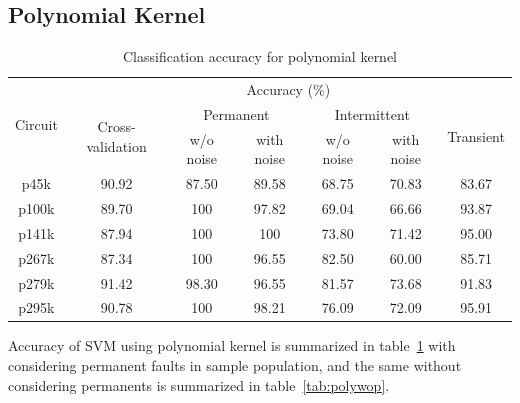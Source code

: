\subsection{Polynomial Kernel}
\begin{table}[h]

	\captionsetup{justification=centering}
\begin{tabular}{ccccccc}
\hline
\multirow{3}{*}{Circuit} & \multicolumn{6}{c}{Accuracy (\%)}\\ \cline{2-7} 
                         & \multirow{2}{*}{Cross-validation} & \multicolumn{2}{c}{Permanent} & \multicolumn{2}{c}{Intermittent} & \multirow{2}{*}{Transient} \\ \cline{3-6}
                         &                                   & w/o noise     & with noise    & w/o noise      & with noise      &                            \\ \hline
p45k                     & 90.92                             & 87.50         & 89.58         & 68.75          & 70.83           & 83.67                      \\
p100k                    & 89.70                             & 100           & 97.82         & 69.04          & 66.66           & 93.87                      \\
p141k                    & 87.94                             & 100           & 100           & 73.80          & 71.42           & 95.00                      \\
p267k                    & 87.34                             & 100           & 96.55         & 82.50          & 60.00           & 85.71                      \\
p279k                    & 91.42                             & 98.30         & 96.55         & 81.57          & 73.68           & 91.83                      \\
p295k                    & 90.78                             & 100           & 98.21         & 76.09          & 72.09           & 95.91      \\
\hline                                                     
\end{tabular}
\caption {Classification accuracy for polynomial kernel}
\label{tab:polywp}
\end{table}

Accuracy of SVM using polynomial kernel is summarized in table~\ref{tab:polywp} with considering permanent faults in sample population, and the same without considering permanents is summarized in table~\ref{tab:polywop}.

